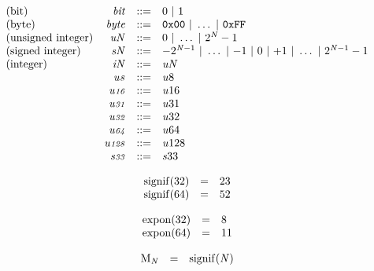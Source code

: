 \vspace{1ex}

\vspace{1ex}

$$
\begin{array}{@{}lrrl@{}l@{}}
\mbox{(bit)} & {\mathit{bit}} &::=& 0 ~|~ 1 \\
\mbox{(byte)} & {\mathit{byte}} &::=& \mathtt{0x00} ~|~ \dots ~|~ \mathtt{0xFF} \\
\mbox{(unsigned integer)} & {{\mathit{u}}}{{\mathit{N}}} &::=& 0 ~|~ \dots ~|~ {2^{{\mathit{N}}}} - 1 \\
\mbox{(signed integer)} & {{\mathit{s}}}{{\mathit{N}}} &::=& {-{2^{{\mathit{N}} - 1}}} ~|~ \dots ~|~ {-1} ~|~ 0 ~|~ {+1} ~|~ \dots ~|~ {2^{{\mathit{N}} - 1}} - 1 \\
\mbox{(integer)} & {{\mathit{i}}}{{\mathit{N}}} &::=& {{\mathit{u}}}{{\mathit{N}}} \\
& {\mathit{u{\scriptstyle8}}} &::=& {{\mathit{u}}}{8} \\
& {\mathit{u{\scriptstyle16}}} &::=& {{\mathit{u}}}{16} \\
& {\mathit{u{\scriptstyle31}}} &::=& {{\mathit{u}}}{31} \\
& {\mathit{u{\scriptstyle32}}} &::=& {{\mathit{u}}}{32} \\
& {\mathit{u{\scriptstyle64}}} &::=& {{\mathit{u}}}{64} \\
& {\mathit{u{\scriptstyle128}}} &::=& {{\mathit{u}}}{128} \\
& {\mathit{s{\scriptstyle33}}} &::=& {{\mathit{s}}}{33} \\
\end{array}
$$

\vspace{1ex}

$$
\begin{array}{@{}lcl@{}l@{}}
{\mathrm{signif}}(32) &=& 23 &  \\
{\mathrm{signif}}(64) &=& 52 &  \\
\end{array}
$$

$$
\begin{array}{@{}lcl@{}l@{}}
{\mathrm{expon}}(32) &=& 8 &  \\
{\mathrm{expon}}(64) &=& 11 &  \\
\end{array}
$$

$$
\begin{array}{@{}lcl@{}l@{}}
{{\mathrm{M}}}_{{\mathit{N}}} &=& {\mathrm{signif}}({\mathit{N}}) &  \\
\end{array}
$$

